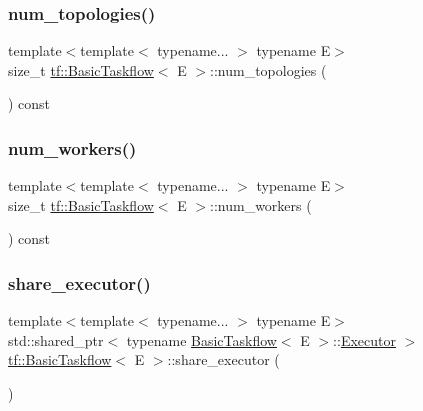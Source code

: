 \mbox{\label{classtf_1_1BasicTaskflow_a7e97ed52d9d0470d2751f32748adb253}} 
\subsubsection{\texorpdfstring{num\+\_\+topologies()}{num\_topologies()}}
{\footnotesize\ttfamily template$<$template$<$ typename... $>$ typename E$>$ \\
size\+\_\+t \hyperlink{classtf_1_1BasicTaskflow}{tf\+::\+Basic\+Taskflow}$<$ E $>$\+::num\+\_\+topologies (\begin{DoxyParamCaption}{ }\end{DoxyParamCaption}) const}

\mbox{\label{classtf_1_1BasicTaskflow_a9cef9ee3d27ffc78bfa953c8ed25b559}} 
\subsubsection{\texorpdfstring{num\+\_\+workers()}{num\_workers()}}
{\footnotesize\ttfamily template$<$template$<$ typename... $>$ typename E$>$ \\
size\+\_\+t \hyperlink{classtf_1_1BasicTaskflow}{tf\+::\+Basic\+Taskflow}$<$ E $>$\+::num\+\_\+workers (\begin{DoxyParamCaption}{ }\end{DoxyParamCaption}) const}

\mbox{\label{classtf_1_1BasicTaskflow_abe76e5288016861aaf1dafc0218d3084}} 
\subsubsection{\texorpdfstring{share\+\_\+executor()}{share\_executor()}}
{\footnotesize\ttfamily template$<$template$<$ typename... $>$ typename E$>$ \\
std\+::shared\+\_\+ptr$<$ typename \hyperlink{classtf_1_1BasicTaskflow}{Basic\+Taskflow}$<$ E $>$\+::\hyperlink{classtf_1_1BasicTaskflow_ab183cd063ba999ac62b5d4e9bb89247d}{Executor} $>$ \hyperlink{classtf_1_1BasicTaskflow}{tf\+::\+Basic\+Taskflow}$<$ E $>$\+::share\+\_\+executor (\begin{DoxyParamCaption}{ }\end{DoxyParamCaption})}


